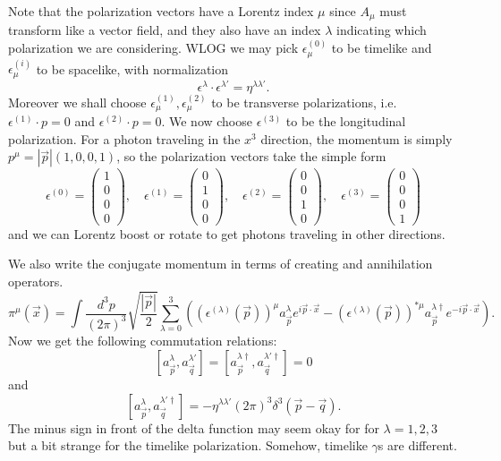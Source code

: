 Note that the polarization vectors have a Lorentz index $\mu$ since $A_\mu$ must transform like a vector field, and they also have an index $\lambda$ indicating which polarization we are considering. WLOG we may pick $\epsilon_\mu^{(0)}$ to be timelike and $\epsilon_\mu^{(i)}$ to be spacelike, with normalization
$$\epsilon^\lambda \cdot \epsilon^{\lambda'}=\eta^{\lambda \lambda'}.$$
Moreover we shall choose $\epsilon_\mu^{(1)},\epsilon_\mu^{(2)}$ to be transverse polarizations, i.e. $\epsilon^{(1)}\cdot p = 0$ and $\epsilon^{(2)}\cdot p = 0$. We now choose $\epsilon^{(3)}$ to be the longitudinal polarization. For a photon traveling in the $x^3$ direction, the momentum is simply $p^\mu=|\vec p|(1,0,0,1)$, so the polarization vectors take the simple form
\begin{equation*}
    \epsilon^{(0)}=\begin{pmatrix}
    1\\0\\0\\0\end{pmatrix}, \quad
    \epsilon^{(1)}=\begin{pmatrix}
    0\\1\\0\\0\end{pmatrix}, \quad
    \epsilon^{(2)}=\begin{pmatrix}
    0\\0\\1\\0\end{pmatrix},\quad
    \epsilon^{(3)}=\begin{pmatrix}
    0\\0\\0\\1\end{pmatrix}
\end{equation*}
and we can Lorentz boost or rotate to get photons traveling in other directions.

We also write the conjugate momentum in terms of creating and annihilation operators.
$$\pi^\mu(\vec x) =\int \frac{d^3p}{(2\pi)^3} \sqrt{\frac{|\vec p|}{2}} \sum_{\lambda=0}^3 \left((\epsilon^{(\lambda)}(\vec p))^{\mu} a_{\vec p}^\lambda e^{i \vec p \cdot \vec x}-(\epsilon^{(\lambda)} (\vec p))^{*\mu} a_{\vec p}^{\lambda \dagger} e^{-i\vec p \cdot \vec x}\right).$$
Now we get the following commutation relations:
$$[a_{\vec p}^\lambda,a_{\vec q}^{\lambda'}]=[a_{\vec p}^{\lambda \dagger},a_{\vec q}^{\lambda' \dagger}]=0$$
and
$$[a_{\vec p}^\lambda, a_{\vec q}^{\lambda' \dagger}]=-\eta^{\lambda \lambda'} (2\pi)^3 \delta^3(\vec p-\vec q).$$
The minus sign in front of the delta function may seem okay for for $\lambda=1,2,3$ but a bit strange for the timelike polarization. Somehow, timelike $\gamma$s are different.

